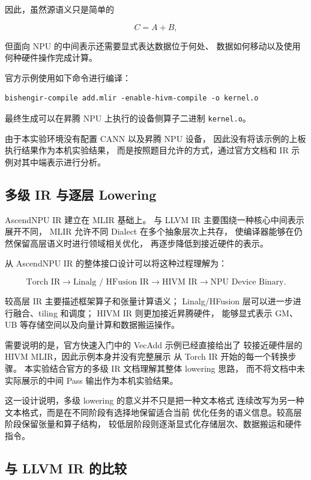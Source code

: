 \documentclass[12pt,a4paper]{ctexart}
\begin{document}
因此，虽然源语义只是简单的

\[
C=A+B,
\]

但面向 NPU 的中间表示还需要显式表达数据位于何处、
数据如何移动以及使用何种硬件操作完成计算。

官方示例使用如下命令进行编译：

\begin{lstlisting}
bishengir-compile add.mlir -enable-hivm-compile -o kernel.o
\end{lstlisting}

最终生成可以在昇腾 NPU 上执行的设备侧算子二进制
\texttt{kernel.o}。

由于本实验环境没有配置 CANN 以及昇腾 NPU 设备，
因此没有将该示例的上板执行结果作为本机实验结果，
而是按照题目允许的方式，通过官方文档和 IR 示例对其中端表示进行分析。

\subsection{多级 IR 与逐层 Lowering}

AscendNPU IR 建立在 MLIR 基础上。
与 LLVM IR 主要围绕一种核心中间表示展开不同，
MLIR 允许不同 Dialect 在多个抽象层次上共存，
使编译器能够在仍然保留高层语义时进行领域相关优化，
再逐步降低到接近硬件的表示。

从 AscendNPU IR 的整体接口设计可以将这种过程理解为：

\[
\text{Torch IR}
\rightarrow
\text{Linalg / HFusion IR}
\rightarrow
\text{HIVM IR}
\rightarrow
\text{NPU Device Binary}.
\]

较高层 IR 主要描述框架算子和张量计算语义；
Linalg/HFusion 层可以进一步进行融合、tiling 和调度；
HIVM IR 则更加接近昇腾硬件，
能够显式表示 GM、UB 等存储空间以及向量计算和数据搬运操作。

需要说明的是，官方快速入门中的 VecAdd 示例已经直接给出了
较接近硬件层的 HIVM MLIR，因此示例本身并没有完整展示
从 Torch IR 开始的每一个转换步骤。
本实验结合官方的多级 IR 文档理解其整体 lowering 思路，
而不将文档中未实际展示的中间 Pass 输出作为本机实验结果。

这一设计说明，多级 lowering 的意义并不只是把一种文本格式
连续改写为另一种文本格式，而是在不同阶段有选择地保留适合当前
优化任务的语义信息。较高层阶段保留张量和算子结构，
较低层阶段则逐渐显式化存储层次、数据搬运和硬件指令。

\subsection{与 LLVM IR 的比较}
\end{document}
